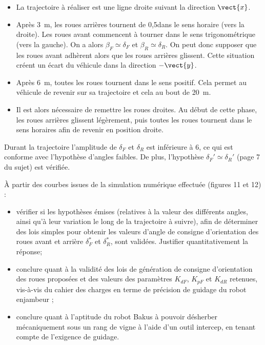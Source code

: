 \documentclass[11pt]{article}
\begin{document}
\begin{UPSTIcorrige}
\begin{itemize}
\item La trajectoire à réaliser est une ligne droite suivant la direction $\vect{x}$.
\item Après \SI{3}{m}, les roues arrières tournent de 0,5\degres dans le sens horaire (vers la droite). Les roues avant commencent à tourner dans le sens trigonométrique (vers la gauche).  On a alors $\beta_F \simeq \delta_F$ et $\beta_R \simeq \delta_R$. On peut donc supposer que les roues avant adhèrent alors que les roues arrières glissent. Cette situation créent un écart du véhicule dans la direction $-\vect{y}$.
\item Après \SI{6}{m}, toutes les roues tournent dans le sens positif. Cela permet au véhicule de revenir sur sa trajectoire et cela au bout de \SI{20}{m}. 
\item Il est alors nécessaire de remettre les roues droites. Au début de cette phase, les roues arrières glissent légèrement, puis toutes les roues tournent dans le sens horaires afin de revenir en position droite.
\end{itemize}

Durant la trajectoire l'amplitude de $\delta_F$ et $\delta_R$ est inférieure à 6\degres, ce qui est conforme avec l'hypothèse d'angles faibles. De plus,  l'hypothèse $\delta_F'\simeq \delta_R'$ (page 7 du sujet) est vérifiée. 
\end{UPSTIcorrige}



\UPSTIquestion  À partir des courbes issues de la simulation numérique effectuée (figures 11 et 12) :
\begin{itemize}
\item vérifier si les hypothèses émises (relatives à la valeur des différents angles, ainsi qu’à leur variation le long
de la trajectoire à suivre), afin de déterminer des lois simples pour obtenir les valeurs d’angle de consigne
d’orientation des roues avant et arrière $\delta_F^*$ et $\delta_R^*$, sont validées. Justifier quantitativement la réponse;
\item conclure quant à la validité des lois de génération de consigne d’orientation des roues proposées et des valeurs
des paramètres $K_{dF}$, $K_{pF}$ et $K_{dR}$ retenues, vis-à-vis du cahier des charges en terme de précision de guidage du robot enjambeur ;
\item conclure quant à l’aptitude du robot Bakus à pouvoir désherber mécaniquement sous un rang de vigne à
l’aide d’un outil intercep, en tenant compte de l’exigence de guidage.
\end{itemize}
\end{document}
